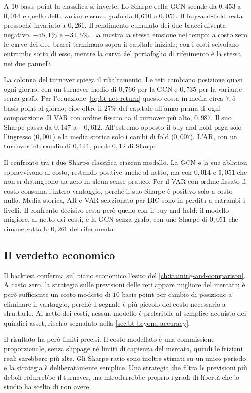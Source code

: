 A $10$ basis point la classifica si inverte. Lo Sharpe della GCN scende da $0{,}453$ a $0{,}014$ e quello della variante senza grafo da $0{,}610$ a $0{,}051$. Il buy-and-hold resta pressoché invariato a $0{,}261$. Il rendimento cumulato dei due bracci diventa negativo, $-55{,}1\%$ e $-31{,}5\%$. La  mostra la stessa erosione nel tempo: a costo zero le curve dei due bracci terminano sopra il capitale iniziale; con i costi scivolano entrambe sotto di esso, mentre la curva del portafoglio di riferimento è la stessa nei due pannelli.

La colonna del turnover spiega il ribaltamento. Le reti cambiano posizione quasi ogni giorno, con un turnover medio di $0{,}766$ per la GCN e $0{,}735$ per la variante senza grafo. Per l'equazione~\eqref{eq:bt-net-return} questo costa in media circa $7{,}5$ basis point al giorno, cioè oltre il $27\%$ del capitale all'anno prima di ogni composizione. Il VAR con ordine fissato ha il turnover più alto, $0{,}987$. Il suo Sharpe passa da $0{,}147$ a $-0{,}612$. All'estremo opposto il buy-and-hold paga solo l'ingresso ($0{,}001$) e la media storica solo i cambi di fold ($0{,}007$). L'AR, con un turnover intermedio di $0{,}141$, perde $0{,}12$ di Sharpe.

Il confronto tra i due Sharpe classifica ciascun modello. La GCN e la sua ablation sopravvivono al costo, restando positive anche al netto, ma con $0{,}014$ e $0{,}051$ che non si distinguono da zero in alcun senso pratico. Per il VAR con ordine fissato il costo consuma l'intero vantaggio, perché il suo Sharpe è positivo solo a costo nullo. Media storica, AR e VAR selezionato per BIC sono in perdita a entrambi i livelli. Il confronto decisivo resta però quello con il buy-and-hold: il modello migliore, al netto dei costi, è la GCN senza grafo, con uno Sharpe di $0{,}051$ che rimane sotto lo $0{,}261$ del riferimento.

\subsection{Il verdetto economico}

Il backtest conferma sul piano economico l'esito del \cref{ch:training-and-comparison}. A costo zero, la strategia sulle previsioni delle reti appare migliore del mercato; è però sufficiente un costo modesto di $10$ basis point per cambio di posizione a eliminare il vantaggio, perché il segnale è più piccolo del costo necessario a sfruttarlo. Al netto dei costi, nessun modello è preferibile al semplice acquisto dei quindici asset, rischio segnalato nella \cref{sec:bt-beyond-accuracy}.

Il risultato ha però limiti precisi. Il costo modellato è una commissione proporzionale, senza slippage né limiti di capienza del mercato, quindi le frizioni reali sarebbero più alte. Gli Sharpe ratio sono inoltre stimati su un unico periodo e la strategia è deliberatamente semplice. Una strategia che filtra le previsioni più deboli ridurrebbe il turnover, ma introdurrebbe proprio i gradi di libertà che lo studio ha scelto di non avere.
